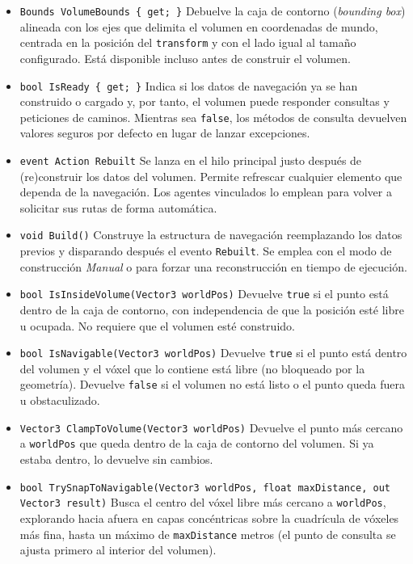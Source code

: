 \begin{itemize}
    \item \texttt{Bounds VolumeBounds \{ get; \}} Debuelve la caja de contorno (\textit{bounding box}) alineada con los ejes que delimita el volumen en coordenadas de mundo, centrada en la posición del \texttt{transform} y con el lado igual al tamaño configurado. Está disponible incluso antes de construir el volumen.
    \item \texttt{bool IsReady \{ get; \}} Indica si los datos de navegación ya se han construido o cargado y, por tanto, el volumen puede responder consultas y peticiones de caminos. Mientras sea \texttt{false}, los métodos de consulta devuelven valores seguros por defecto en lugar de lanzar excepciones.
    \item \texttt{event Action Rebuilt} Se lanza en el hilo principal justo después de (re)construir los datos del volumen. Permite refrescar cualquier elemento que dependa de la navegación.
    Los agentes vinculados lo emplean para volver a solicitar sus rutas de forma automática.
    \item \texttt{void Build()} Construye la estructura de navegación reemplazando los datos previos y disparando después el evento \texttt{Rebuilt}.
    Se emplea con el modo de construcción \textit{Manual} o para forzar una reconstrucción en tiempo de ejecución.
    \item \texttt{bool IsInsideVolume(Vector3 worldPos)} Devuelve \texttt{true} si el punto está dentro de la caja de contorno, con independencia de que la posición esté libre u ocupada.
    No requiere que el volumen esté construido.
    \item \texttt{bool IsNavigable(Vector3 worldPos)} Devuelve \texttt{true} si el punto está dentro del volumen y el vóxel que lo contiene está libre (no bloqueado por la geometría). Devuelve \texttt{false} si el volumen no está listo o el punto queda fuera u obstaculizado.
    \item \texttt{Vector3 ClampToVolume(Vector3 worldPos)} Devuelve el punto más cercano a \texttt{worldPos} que queda dentro de la caja de contorno del volumen.
    Si ya estaba dentro, lo devuelve sin cambios.
    \item \texttt{bool TrySnapToNavigable(Vector3 worldPos, float maxDistance, out Vector3 result)} Busca el centro del vóxel libre más cercano a \texttt{worldPos}, explorando hacia afuera en capas concéntricas sobre la cuadrícula de vóxeles más fina, hasta un máximo de \texttt{maxDistance} metros (el punto de consulta se ajusta primero al interior del volumen).

\end{itemize}
